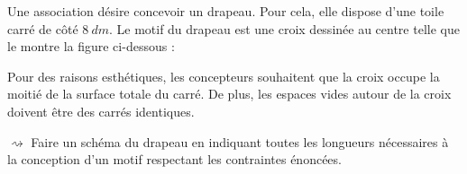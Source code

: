 \documentclass[10pt,openright,twoside,french]{book}
\begin{document}

Une association désire concevoir un drapeau. Pour cela, elle dispose d'une toile carré de côté $8~dm$. Le motif du drapeau est une croix dessinée au centre telle que le montre la figure ci-dessous :

\begin{center}
\end{center}

Pour des raisons esthétiques, les concepteurs souhaitent que la croix occupe la moitié de la surface totale du carré. De plus, les espaces vides autour de la croix doivent être des carrés identiques.\medskip

$\rightsquigarrow$ Faire un schéma du drapeau en indiquant toutes les longueurs nécessaires à la conception d'un motif respectant les contraintes énoncées.
\end{document}
